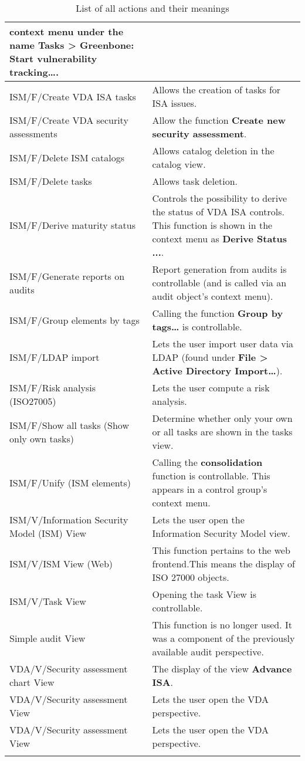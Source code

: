 \documentclass[a4paper,10pt]{book}
\begin{document}
\begin{longtable}{| p{5cm} | p{6cm} |}
context menu under the name \textbf{Tasks > Greenbone: Start vulnerability
tracking…}. \\[10pt] \hline
ISM/F/Create VDA ISA tasks & Allows the creation of tasks for ISA issues.
\\[10pt] \hline
ISM/F/Create VDA security assessments & Allow the function \textbf{Create new
security assessment}. \\[10pt] \hline
ISM/F/Delete ISM catalogs & Allows catalog deletion in the catalog view.
\\[10pt] \hline
ISM/F/Delete tasks & Allows task deletion.  \\[10pt] \hline
ISM/F/Derive maturity status & Controls the possibility to derive the status of
VDA ISA controls. This function is shown in the context menu as  \textbf{Derive
Status ...}. \\[10pt] \hline
ISM/F/Generate reports on audits & Report generation from audits is
controllable (and is called via an audit object's context menu). \\[10pt] \hline
ISM/F/Group elements by tags & Calling the function \textbf{Group by tags…} is
controllable. \\[10pt] \hline
ISM/F/LDAP import & Lets the user import user data via LDAP (found under
\textbf{File > Active Directory Import…}). \\[10pt] \hline
ISM/F/Risk analysis (ISO27005) & Lets the user compute a risk analysis.
\\[10pt] \hline
ISM/F/Show all tasks (Show only own tasks) & Determine whether only your own or
all tasks are shown in the tasks view. \\[10pt] \hline
ISM/F/Unify (ISM elements) & Calling the \textbf{consolidation} function is
controllable. This appears in a control group's context menu. \\[10pt] \hline
ISM/V/Information Security Model (ISM) View & Lets the user open the
Information Security Model view. \\[10pt] \hline
ISM/V/ISM View (Web) & This function pertains to the web frontend.This means
the display of ISO 27000 objects. \\[10pt] \hline
ISM/V/Task View & Opening the task View is controllable.  \\[10pt] \hline
Simple audit View & This function is no longer used. It was a component of the
previously available audit perspective. \\[10pt] \hline
VDA/V/Security assessment chart View & The display of the view \textbf{Advance
ISA}. \\[10pt] \hline
VDA/V/Security assessment View & Lets the user open the VDA perspective.
\\[10pt] \hline
VDA/V/Security assessment View & Lets the user open the VDA perspective.
\\[10pt] \hline
\caption{List of all actions and their meanings}
\end{longtable}
\end{document}
